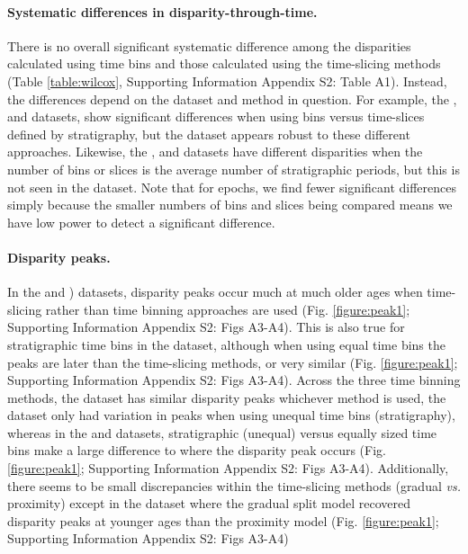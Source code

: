 \documentclass[12pt,a4paper]{article}
\begin{document}
\paragraph{Systematic differences in disparity-through-time.} 
There is no overall significant systematic difference among the disparities calculated using time bins and those calculated using the time-slicing methods (Table \ref{table:wilcox}, Supporting Information Appendix S2: Table A1).
Instead, the differences depend on the dataset and method in question.
For example, the \cite{brusatte2014gradual}, \cite{bapst2016topology} and \cite{wright2017bayesian} datasets, show significant differences when using bins versus time-slices defined by stratigraphy, but the \cite{beckancient2014} dataset appears robust to these different approaches.
Likewise, the \cite{beckancient2014}, \cite{brusatte2014gradual} and \cite{bapst2016topology} datasets have different disparities when the number of bins or slices is the average number of stratigraphic periods, but this is not seen in the \cite{wright2017bayesian} dataset.
Note that for epochs, we find fewer significant differences simply because the smaller numbers of bins and slices being compared means we have low power to detect a significant difference.

%  

\paragraph{Disparity peaks.}
In the \cite{beckancient2014} and \cite{bapst2016topology}) datasets, disparity peaks occur much at much older ages when time-slicing rather than time binning approaches are used (Fig. \ref{figure:peak1}; Supporting Information Appendix S2: Figs A3-A4).
This is also true for stratigraphic time bins in the \cite{wright2017bayesian} dataset, although when using equal time bins the peaks are later than the time-slicing methods, or very similar (Fig. \ref{figure:peak1}; Supporting Information Appendix S2: Figs A3-A4).
Across the three time binning methods, the \cite{brusatte2014gradual} dataset has similar disparity peaks whichever method is used, the \cite{wright2017bayesian} dataset only had variation in peaks when using unequal time bins (stratigraphy), whereas in the \cite{bapst2016topology} and \cite{beckancient2014} datasets, stratigraphic (unequal) versus equally sized time bins make a large difference to where the disparity peak occurs (Fig. \ref{figure:peak1}; Supporting Information Appendix S2: Figs A3-A4).
Additionally, there seems to be small discrepancies within the time-slicing methods (gradual \textit{vs.} proximity) except in the \cite{beckancient2014} dataset where the gradual split model recovered disparity peaks at younger ages than the proximity model (Fig. \ref{figure:peak1}; Supporting Information Appendix S2: Figs A3-A4)
\end{document}
